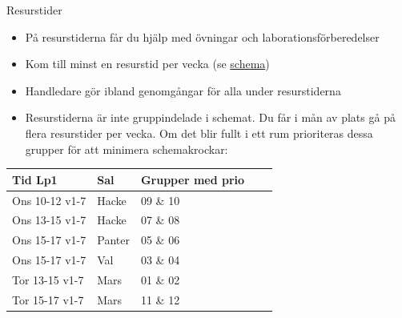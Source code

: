 \documentclass{lecturenotes}
\begin{document}
\begin{Slide}{Resurstider}
\begin{itemize}
\item På resurstiderna får du hjälp med övningar och laborationsförberedelser
\item Kom till minst en resurstid per vecka (se \href{http://cs.lth.se/eda016/schema/}{schema})
\item Handledare gör ibland genomgångar för alla under resurstiderna
\item Resurstiderna är inte gruppindelade i schemat. Du får i mån av plats gå på flera resurstider per vecka. Om det blir fullt i ett rum prioriteras dessa grupper för att minimera schemakrockar: 
\end{itemize}
\begin{table}[]
\centering\scriptsize
\begin{tabular}{lllll}
Tid Lp1 & Sal & Grupper med prio \\
\hline
Ons 10-12 v1-7 & Hacke  &   09 \& 10 \\
Ons 13-15 v1-7 & Hacke  &   07 \& 08  \\
Ons 15-17 v1-7 & Panter  & 05 \& 06   \\
Ons 15-17 v1-7 & Val       &  03 \& 04   \\
Tor 13-15 v1-7 & Mars     & 01 \& 02  \\
Tor 15-17 v1-7 & Mars     & 11 \& 12 \\ 
\end{tabular}
\end{table}
\end{Slide}




\end{document}

